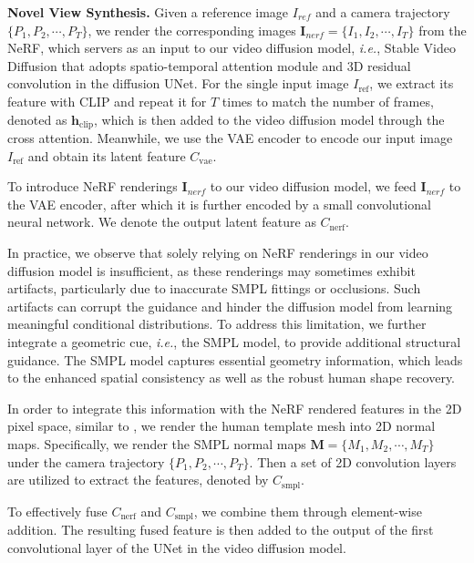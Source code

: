 \noindent \textbf{Novel View Synthesis.} Given a reference image $I_{ref}$ and a camera trajectory $\{P_1, P_2, \cdots, P_T\}$, we render the corresponding images $\bm{I}_{nerf} = \{I_1, I_2, \cdots, I_T\}$ from the NeRF, which servers as an input to our video diffusion model, \textit{i.e.}, Stable Video Diffusion \cite{blattmann2023stable} that adopts spatio-temporal attention module and 3D residual convolution in the diffusion UNet. For the single input image $I_\text{ref}$, we extract its feature with CLIP \cite{radford2021learning} and repeat it for $T$ times to match the number of frames, denoted as $\bm{h}_\text{clip}$, which is then added to the video diffusion model through the cross attention. Meanwhile, we use the VAE encoder to encode our input image $I_\text{ref}$ and obtain its latent feature $C_\text{vae}$.


To introduce NeRF renderings $\bm{I}_{nerf}$ to our video diffusion model, we feed $\bm{I}_{nerf}$ to the VAE encoder, after which it is further encoded by a small convolutional neural network. We denote the output latent feature as $C_{\text{nerf}}$.


In practice, we observe that solely relying on NeRF renderings in our video diffusion model is insufficient, as these renderings may sometimes exhibit artifacts, particularly due to inaccurate SMPL fittings or occlusions. Such artifacts can corrupt the guidance and hinder the diffusion model from learning meaningful conditional distributions. To address this limitation, we further integrate a geometric cue, \textit{i.e.}, the SMPL model, to provide additional structural guidance. The SMPL model captures essential geometry information, which leads to the enhanced spatial consistency as well as the robust human shape recovery. 

In order to integrate this information with the NeRF rendered features in the 2D pixel space, similar to \cite{zhu2024champ}, we render the human template mesh into 2D normal maps. Specifically, we render the SMPL normal maps $\bm{M}=\{M_1, M_2, \cdots, M_T\}$ under the camera trajectory $\{P_1, P_2, \cdots, P_T\}$. Then a set of 2D convolution layers are utilized to extract the features, denoted by $C_{\text{smpl}}$.

To effectively fuse \( C_{\text{nerf}} \) and \( C_{\text{smpl}} \), we combine them through element-wise addition. The resulting fused feature is then added to the output of the first convolutional layer of the UNet in the video diffusion model.



